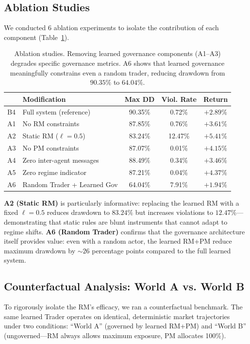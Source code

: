 \documentclass[11pt]{article}
\begin{document}
\subsection{Ablation Studies}
We conducted 6 ablation experiments to isolate the contribution of each component (Table~\ref{tab:ablations}).

\begin{table}[h]
\centering
\small
\begin{tabular}{@{}llccc@{}}
\toprule
& \textbf{Modification} & \textbf{Max DD} & \textbf{Viol. Rate} & \textbf{Return} \\ \midrule
B4 & Full system (reference)        & 90.35\% & 0.72\% & $+2.89\%$ \\
A1 & No RM constraints              & 87.85\% & 0.76\% & $+3.61\%$ \\
A2 & Static RM ($\ell = 0.5$)       & 83.24\% & 12.47\% & $+5.41\%$ \\
A3 & No PM constraints              & 87.07\% & 0.01\% & $+4.15\%$ \\
A4 & Zero inter-agent messages      & 88.49\% & 0.34\% & $+3.46\%$ \\
A5 & Zero regime indicator          & 87.21\% & 0.04\% & $+4.37\%$ \\
A6 & Random Trader + Learned Gov    & 64.04\% & 7.91\% & $+1.94\%$ \\ \bottomrule
\end{tabular}
\caption{Ablation studies. Removing learned governance components (A1--A3) degrades specific governance metrics. A6 shows that learned governance meaningfully constrains even a random trader, reducing drawdown from $90.35\%$ to $64.04\%$.}
\label{tab:ablations}
\end{table}

\textbf{A2 (Static RM)} is particularly informative: replacing the learned RM with a fixed $\ell=0.5$ reduces drawdown to $83.24\%$ but increases violations to $12.47\%$---demonstrating that static rules are blunt instruments that cannot adapt to regime shifts. \textbf{A6 (Random Trader)} confirms that the governance architecture itself provides value: even with a random actor, the learned RM+PM reduce maximum drawdown by $\sim 26$ percentage points compared to the full learned system.

\subsection{Counterfactual Analysis: World A vs. World B}
\label{sec:counterfactual}
To rigorously isolate the RM's efficacy, we ran a counterfactual benchmark. The same learned Trader operates on identical, deterministic market trajectories under two conditions: ``World A'' (governed by learned RM+PM) and ``World B'' (ungoverned---RM always allows maximum exposure, PM allocates 100\%).
\end{document}
